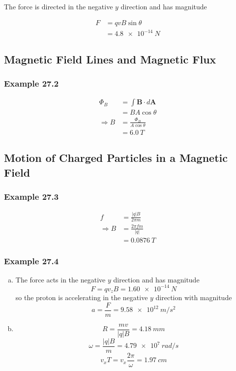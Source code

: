 \documentclass{article}
\begin{document}
The force is directed in the negative $y$ direction and has magnitude

\begin{align*}
  F & = q v B \sin \theta \\
    & = \qty{4.8e-14}{N}
\end{align*}

\subsection{Magnetic Field Lines and Magnetic Flux}

\subsubsection{Example 27.2}

\begin{align*}
  \Phi_B        & = \int \mathbf{B} \cdot d \mathbf{A} \\
                & = B A \cos \theta                    \\
  \Rightarrow B & = \frac{\Phi_B}{A \cos \theta}       \\
                & = \qty{6.0}{T}
\end{align*}

\subsection{Motion of Charged Particles in a Magnetic Field}

\subsubsection{Example 27.3}

\begin{align*}
  f             & = \frac{|q| B}{2 \pi m} \\
  \Rightarrow B & = \frac{2 \pi f m}{|q|} \\
                & = \qty{0.0876}{T}
\end{align*}

\subsubsection{Example 27.4}

\begin{enumerate}[(a)]
  \item The force acts in the negative $y$ direction and has magnitude \[F = q v_z B = \qty{1.60e-14}{N}\] so the proton is accelerating in the negative $y$ direction with magnitude \[a = \frac{F}{m} = \qty{9.58e12}{m/s^2}\]

  \item \[R = \frac{m v}{|q| B} = \qty{4.18}{mm}\] \[\omega = \frac{|q| B}{m} = \qty{4.79e7}{rad/s}\] \[v_x T = v_x \frac{2 \pi}{\omega} = \qty{1.97}{cm}\]
\end{enumerate}
\end{document}
